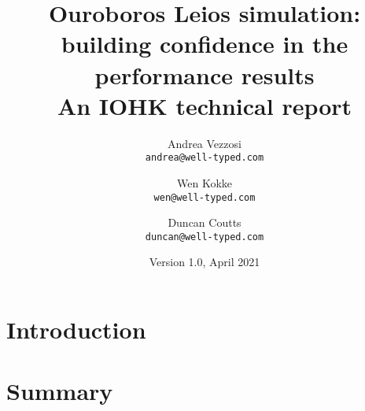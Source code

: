 \documentclass[11pt,a4paper]{article}
\begin{document}
\title{Ouroboros Leios simulation: \\
       building confidence in the performance results \\
       {\large \sc An IOHK technical report}
  }
\date{Version 1.0, April 2021}
\author{Andrea Vezzosi     \\ {\small \texttt{andrea@well-typed.com}} \\
   \and Wen Kokke          \\ {\small \texttt{wen@well-typed.com}} \\
   \and Duncan Coutts      \\ {\small \texttt{duncan@well-typed.com}}
   }

\maketitle

\section{Introduction}
\label{introduction}


\tableofcontents

\listoftodos

\section{Summary}
\label{summary}




\end{document}
